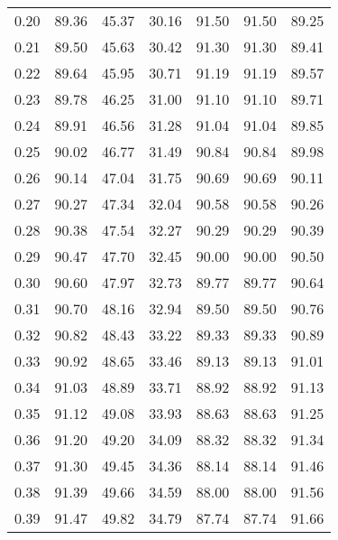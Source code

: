 \begin{tabular}{|c|c|c|c|c|c|c|}
      0.20 &     89.36 &     45.37 &      30.16 &   91.50 &      91.50 &         89.25 \\
      0.21 &     89.50 &     45.63 &      30.42 &   91.30 &      91.30 &         89.41 \\
      0.22 &     89.64 &     45.95 &      30.71 &   91.19 &      91.19 &         89.57 \\
      0.23 &     89.78 &     46.25 &      31.00 &   91.10 &      91.10 &         89.71 \\
      0.24 &     89.91 &     46.56 &      31.28 &   91.04 &      91.04 &         89.85 \\
      0.25 &     90.02 &     46.77 &      31.49 &   90.84 &      90.84 &         89.98 \\
      0.26 &     90.14 &     47.04 &      31.75 &   90.69 &      90.69 &         90.11 \\
      0.27 &     90.27 &     47.34 &      32.04 &   90.58 &      90.58 &         90.26 \\
      0.28 &     90.38 &     47.54 &      32.27 &   90.29 &      90.29 &         90.39 \\
      0.29 &     90.47 &     47.70 &      32.45 &   90.00 &      90.00 &         90.50 \\
      0.30 &     90.60 &     47.97 &      32.73 &   89.77 &      89.77 &         90.64 \\
      0.31 &     90.70 &     48.16 &      32.94 &   89.50 &      89.50 &         90.76 \\
      0.32 &     90.82 &     48.43 &      33.22 &   89.33 &      89.33 &         90.89 \\
      0.33 &     90.92 &     48.65 &      33.46 &   89.13 &      89.13 &         91.01 \\
      0.34 &     91.03 &     48.89 &      33.71 &   88.92 &      88.92 &         91.13 \\
      0.35 &     91.12 &     49.08 &      33.93 &   88.63 &      88.63 &         91.25 \\
      0.36 &     91.20 &     49.20 &      34.09 &   88.32 &      88.32 &         91.34 \\
      0.37 &     91.30 &     49.45 &      34.36 &   88.14 &      88.14 &         91.46 \\
      0.38 &     91.39 &     49.66 &      34.59 &   88.00 &      88.00 &         91.56 \\
      0.39 &     91.47 &     49.82 &      34.79 &   87.74 &      87.74 &         91.66 \\

\end{tabular}
